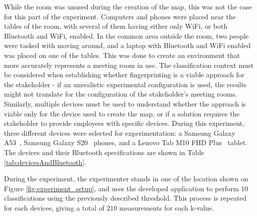 While the room was unused during the creation of the map, this was not the case for this part of the experiment.
Computers and phones were placed near the tables of the room, with several of them having either only WiFi, or both Bluetooth and WiFi, enabled. 
In the common area outside the room, two people were tasked with moving around, and a laptop with Bluetooth and WiFi enabled was placed on one of the tables.
This was done to create an environment that more accurately represents a meeting room in use.
The classification context must be considered when establishing whether fingerprinting is a viable approach for the stakeholder - if an unrealistic experimental configuration is used, the results might not translate for the configuration of the stakeholder's meeting rooms. 
Similarly, multiple devices must be used to understand whether the approach is viable only for the device used to create the map, or if a solution requires the stakeholder to provide employees with specific devices. 
During this experiment, three different devices were selected for experimentation: a Samsung Galaxy A53~\cite{a53phone}, Samsung Galaxy S20~\cite{galaxy20phone} phones, and a Lenovo Tab M10 FHD Plus~\cite{tablet} tablet. 
The devices and their Bluetooth specifications are shown in Table \ref{tab:devicesAndBluetooth}.

\begin{table}[h!]
    \caption{The devices used in during classification and their supported Bluetooth version.}
    \label{tab:devicesAndBluetooth}
\end{table}

During the experiment, the experimenter stands in one of the location shown on Figure \ref{fig:experiment_setup}, and uses the developed application to perform $10$ classifications using the previously described threshold.
This process is repeated for each devices, giving a total of $210$ measurements for each k-value.